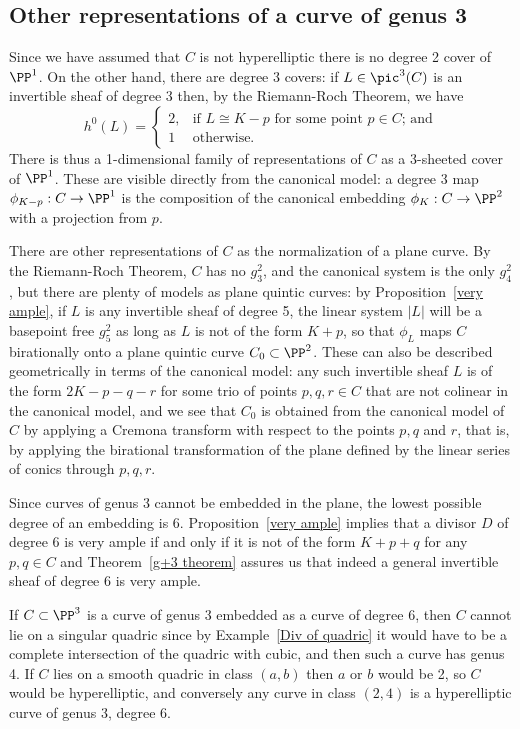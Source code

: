 \subsection{Other representations of a curve of genus 3}
Since we have assumed that $C$ is not hyperelliptic there is no degree 2 cover of $\PP^1$. On the other hand, there are degree 3 covers: if $L \in \pic^3(C)$ is an invertible sheaf of degree 3 then, by the Riemann-Roch Theorem, we have
$$
h^0(L) = 
\begin{cases}
2, &\text{if $L \cong K-p$ for some point $p \in C$; and} \\
1 &\text{otherwise.}
\end{cases}
$$
There is thus a 1-dimensional family of representations of $C$ as a 3-sheeted cover of $\PP^1$. These are  visible directly from the canonical model: a degree 3 map $\phi_{K-p} : C \to \PP^1$ is the composition of the canonical embedding $\phi_K : C \to \PP^2$ with a projection from $p$. 

There are other representations of $C$ as the normalization of a plane curve. By the Riemann-Roch Theorem, $C$ has no $g^2_3$, and the canonical system is the only $g^2_4$, but there are plenty of models as plane quintic curves: by Proposition~\ref{very ample}, if $L$ is any invertible sheaf of degree 5, the linear system $|L|$ will be a basepoint free $g^2_5$ as long as $L$ is not of the form $K+p$, so that $\phi_L$ maps $C$ birationally onto a plane quintic curve $C_0 \subset \PP^2$. These can also be described geometrically in terms of the canonical model: any such invertible sheaf $L$ is of the form $2K-p-q-r$ for some trio of  points $p, q, r \in C$ that are not colinear in the canonical model, and we see  that $C_0$ is obtained from the canonical model of $C$ by applying a Cremona transform with respect to the points $p, q$ and $r$, that is, by applying the birational transformation
of the plane defined by the linear series of conics through $p,q,r$.

Since curves of genus 3 cannot be embedded in the plane, the lowest possible degree of an embedding is 6. Proposition~\ref{very ample} implies that a divisor $D$ of degree 6 is very ample if and only if it is not of the form $K+p+q$ for any $p, q \in C$ and Theorem~\ref{g+3 theorem} assures us that indeed a general invertible sheaf of degree 6 is very ample.  

If $C\subset \PP^3$ is a curve of genus 3 embedded as a curve of degree 6, then $C$ cannot lie on a singular quadric since by Example~\ref{Div of quadric} it would
have to be a complete intersection of the quadric with cubic, and then such a curve has genus 4. If $C$ lies on a smooth quadric
in class $(a,b)$ then $a$ or $b$ would be 2, so $C$ would be hyperelliptic, and conversely any curve in class $(2,4)$ 
is a hyperelliptic curve of genus 3, degree 6. 

